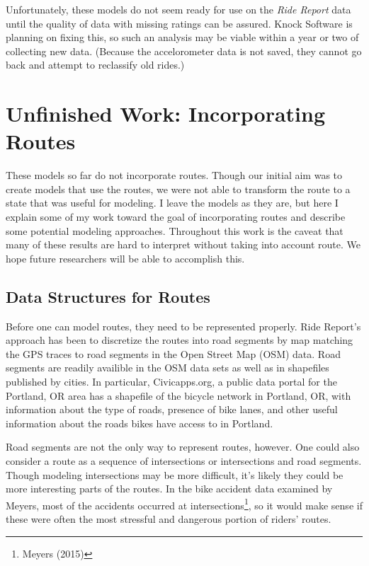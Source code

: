 \documentclass[12pt,twoside]{reedthesis}
\begin{document}
  Unfortunately, these models do not seem ready for use on the \emph{Ride
  Report} data until the quality of data with missing ratings can be
  assured. Knock Software is planning on fixing this, so such an analysis
  may be viable within a year or two of collecting new data. (Because the
  accelorometer data is not saved, they cannot go back and attempt to
  reclassify old rides.)
  
  \chapter{Unfinished Work: Incorporating Routes}\label{routes}
  
  These models so far do not incorporate routes. Though our initial aim
  was to create models that use the routes, we were not able to transform
  the route to a state that was useful for modeling. I leave the models as
  they are, but here I explain some of my work toward the goal of
  incorporating routes and describe some potential modeling approaches.
  Throughout this work is the caveat that many of these results are hard
  to interpret without taking into account route. We hope future
  researchers will be able to accomplish this.
  
  \section{Data Structures for Routes}\label{data-structures-for-routes}
  
  Before one can model routes, they need to be represented properly. Ride
  Report's approach has been to discretize the routes into road segments
  by map matching the GPS traces to road segments in the Open Street Map
  (OSM) data. Road segments are readily availible in the OSM data sets as
  well as in shapefiles published by cities. In particular, Civicapps.org,
  a public data portal for the Portland, OR area has a shapefile of the
  bicycle network in Portland, OR, with information about the type of
  roads, presence of bike lanes, and other useful information about the
  roads bikes have access to in Portland.
  
  Road segments are not the only way to represent routes, however. One
  could also consider a route as a sequence of intersections or
  intersections and road segments. Though modeling intersections may be
  more difficult, it's likely they could be more interesting parts of the
  routes. In the bike accident data examined by Meyers, most of the
  accidents occurred at intersections\footnote{Meyers (2015)}, so it would
  make sense if these were often the most stressful and dangerous portion
  of riders' routes.
  
\end{document}
